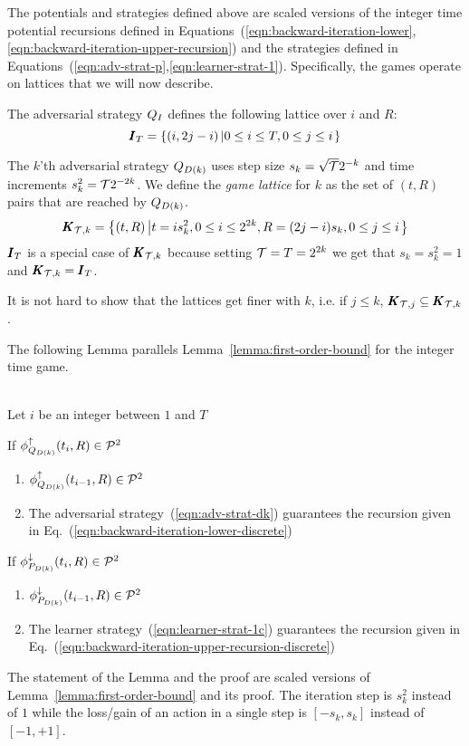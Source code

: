 \documentclass{article}[12pt]
\begin{document}
The potentials and strategies defined above are scaled versions of the
integer time potential recursions defined in
Equations~(\ref{eqn:backward-iteration-lower},\ref{eqn:backward-iteration-upper-recursion})
and the strategies defined in Equations~(\ref{eqn:adv-strat-p},\ref{eqn:learner-strat-1}). Specifically, the games operate on lattices that we will now describe.

The adversarial strategy $Q_I$ defines the following lattice over $i$ and $R$:
$$\pmb{I}_{T}=\left\{ (i,2j-i) \left| 0 \leq i \leq T, 0 \leq j \leq i\right. \right\}$$

The $k$'th adversarial strategy $Q_{D(k)}$ uses step size $s_k=\sqrt{\mathcal{T}} 2^{-k}$ and time
increments $s_k^2=\mathcal{T} 2^{-2k}$. We define the {\em game lattice}
for $k$ as the set of $(t,R)$ pairs that are reached by $Q_{D(k)}$.
$$\pmb{K}_{{\mathcal{T},k}}=\left\{ (t,R) \left| t=i s_k^2, 0 \leq i \leq 2^{2k}, R=(2j-i)s_k, 0 \leq j \leq i\right. \right\}$$
$\pmb{I}_{T}$ is a special case of $\pmb{K}_{\mathcal{T},k}$ because setting
$\mathcal{T}=T=2^{2k}$ we get that $s_k=s_k^2=1$ and  $\pmb{K}_{\mathcal{T},k} = \pmb{I}_{T}$.

It is not hard to show that the lattices get finer with $k$, i.e. if  $j \leq k$,  $\pmb{K}_{\mathcal{T},j} \subseteq \pmb{K}_{\mathcal{T},k}$.

The following Lemma parallels Lemma~\ref{lemma:first-order-bound} for the integer time game.
\begin{lemma} \label{lemma:discrete-step-bound}
~\\
Let $i$ be an integer between $1$ and $T$

If $\phi_{Q_{D(k)}}^{\uparrow}(t_i,R) \in {\cal P}^{2}$
\begin{enumerate}
\item  $\phi_{Q_{D(k)}}^{\uparrow}(t_{i-1},R) \in {\cal P}^{2}$
\item The adversarial strategy~(\ref{eqn:adv-strat-dk})
  guarantees the recursion given in Eq.~(\ref{eqn:backward-iteration-lower-discrete})
\end{enumerate}

If $\phi_{P_{D(k)}}^{\downarrow}(t_i,R) \in {\cal P}^{2}$
\begin{enumerate}
\item $\phi_{P_{D(k)}}^{\downarrow}(t_{i-1},R) \in {\cal P}^{2}$
\item The learner strategy~(\ref{eqn:learner-strat-1c})
  guarantees the recursion given in Eq.~(\ref{eqn:backward-iteration-upper-recursion-discrete})
\end{enumerate}

\end{lemma}
\proof
The statement of the Lemma and the proof are scaled versions of
Lemma~\ref{lemma:first-order-bound} and its proof. The iteration step
is $s_k^2$ instead of $1$ while the loss/gain of an action in a single
step is $[-s_k,s_k]$ instead of $[-1,+1]$.
\end{document}
